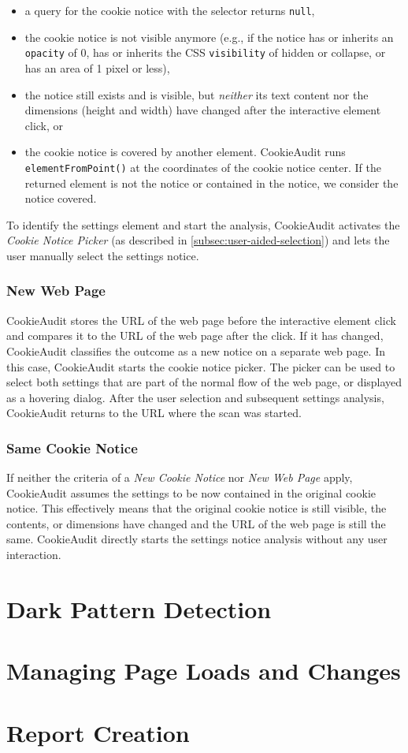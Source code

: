 \begin{itemize} 
    \item a query for the cookie notice with the selector returns \texttt{null},
    \item the cookie notice is not visible anymore (e.g., if the notice has or inherits an \texttt{opacity} of 0, has or inherits the CSS \texttt{visibility} of hidden or collapse, or has an area of 1 pixel or less),
    \item the notice still exists and is visible, but \emph{neither} its text content nor the dimensions (height and width) have changed after the interactive element click, or
    \item the cookie notice is covered by another element. CookieAudit runs \texttt{elementFromPoint()} at the coordinates of the cookie notice center. If the returned element is not the notice or contained in the notice, we consider the notice covered.
\end{itemize}

To identify the settings element and start the analysis, CookieAudit activates the \emph{Cookie Notice Picker} (as described in \cref{subsec:user-aided-selection}) and lets the user manually select the settings notice.

\subsubsection{New Web Page}
CookieAudit stores the URL of the web page before the interactive element click and compares it to the URL of the web page after the click.
If it has changed, CookieAudit classifies the outcome as a new notice on a separate web page.
In this case, CookieAudit starts the cookie notice picker. 
The picker can be used to select both settings that are part of the normal flow of the web page, or displayed as a hovering dialog.
After the user selection and subsequent settings analysis, CookieAudit returns to the URL where the scan was started.

\subsubsection{Same Cookie Notice}
If neither the criteria of a \emph{New Cookie Notice} nor \emph{New Web Page} apply, CookieAudit assumes the settings to be now contained in the original cookie notice.
This effectively means that the original cookie notice is still visible, the contents, or dimensions have changed and the URL of the web page is still the same.
CookieAudit directly starts the settings notice analysis without any user interaction.

\section{Dark Pattern Detection}

\section{Managing Page Loads and Changes}
\section{Report Creation}